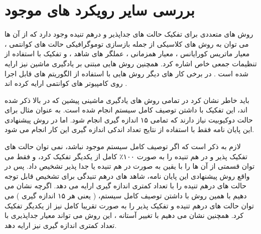 \section{بررسی سایر رویکرد های موجود}

روش های متعددی برای تفکیک حالت های جداپذیر و درهم تنیده وجود دارد که از آن ها می توان به روش های کلاسیکی از جمله بازسازی توموگرافیکی
حالت های کوانتمی
\cite{Lu2016}،
معیار ماتریس کورایانس
\cite{Guhne2007}،
معیار همزمانی
\cite{Wootters1998,Rungta2001,DeVicente2007}،
عملگر های شاهد
\cite{horodecki_1996,Terhal2000}،
و تفکیک با استفاده از تنظیمات جمعی خاص
\cite{Pezze2016}
اشاره کرد.
همچنین روش هایی مبتنی بر یادگیری ماشین نیز ارایه شده است
\cite{Wisniewska2015,Gao2018,Ma2018,Lu2018,Gray2018,Deng2018,Levine2018,Liu2018,Qiu2019}.
در برخی کار های دیگر روش هایی با استفاده از الگوریتم های قابل اجرا روی کامپیوتر های کوانتمی ارایه کرده اند
\cite{Cai2015,behrman2002}.

باید خاطر نشان کرد در تمامی روش های یادگیری ماشینی پیشین که در بالا ذکر شده اند، این تفکیک با داشتن توصیف کامل سیستم انجام شده است. به عنوان مثال برای حالت دوکیوبیت نیاز دارند که تمامی
۱۵
اندازه گیری انجام شود.
اما در روش پیشنهادی این پایان نامه فقط با استفاده از نتایج تعداد اندکی اندازه گیری این کار انجام می شود.

لازم به ذکر است که اگر توصیف کامل سیستم موجود نباشد، نمی توان حالت های تفکیک پذیر و در هم تنیده را به صورت
۱۰۰٪
کامل از یکدیگر تفکیک کرد، و فقط می توان قسمتی از آن ها را با یقین به صورت در هم تنیده یا جدا پذیر تشخیص داد. پس در واقع روش پیشنهادی این پایان نامه، شاهد های درهم تنیدگی برای تشخیص قابل توجه حالت های درهم تنیده را با تعداد کمتری اندازه گیری ارایه می دهد. اگرچه نشان می دهیم با همین روش با داشتن توصیف کامل سیستم،
(
یعنی هر ۱۵ اندازه گیری
)
می توان حالت های درهم تنیده و تفکیک پذیر را به صورت تقریبا کامل نیز از یکدیگر تفکیک کرد.
همچنین نشان می دهیم با تغییر آستانه
،
این روش می تواند معیار جداپذیری
با تعداد کمتری اندازه گیری نیز ارایه دهد.
